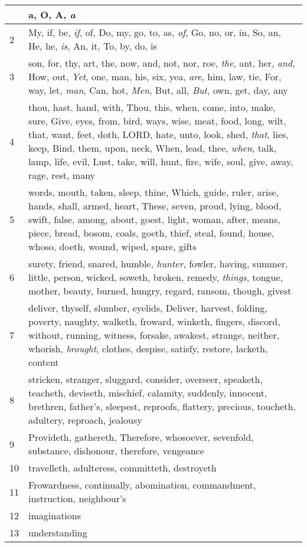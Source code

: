 \begin{center}
\begin{longtable}{l|p{3.75in}}
\hline \hline 
\endlastfoot 
1 & a, O, A, \emph{a}\\ \hline 
2 & My, if, be, \emph{if}, of, Do, my, go, to, as, \emph{of}, Go, no, or, in, So, an, He, he, \emph{is}, An, it, To, by, do, is\\ \hline 
3 & son, for, thy, art, the, now, and, not, nor, roe, \emph{the}, ant, her, \emph{and}, How, out, \emph{Yet}, one, man, his, six, yea, \emph{are}, him, law, tie, For, way, let, \emph{man}, Can, hot, \emph{Men}, But, all, \emph{But}, own, get, day, any\\ \hline 
4 & thou, hast, hand, with, Thou, this, when, come, into, make, sure, Give, eyes, from, bird, ways, wise, meat, food, long, wilt, that, want, feet, doth, LORD, hate, unto, look, shed, \emph{that}, lies, keep, Bind, them, upon, neck, When, lead, thee, \emph{when}, talk, lamp, life, evil, Lust, take, will, hunt, fire, wife, soul, give, away, rage, rest, many\\ \hline 
5 & words, mouth, taken, sleep, thine, Which, guide, ruler, arise, hands, shall, armed, heart, These, seven, proud, lying, blood, swift, false, among, about, goest, light, woman, after, means, piece, bread, bosom, coals, goeth, thief, steal, found, house, whoso, doeth, wound, wiped, spare, gifts\\ \hline 
6 & surety, friend, snared, humble, \emph{hunter}, fowler, having, summer, little, person, wicked, soweth, broken, remedy, \emph{things}, tongue, mother, beauty, burned, hungry, regard, ransom, though, givest\\ \hline 
7 & deliver, thyself, slumber, eyelids, Deliver, harvest, folding, poverty, naughty, walketh, froward, winketh, fingers, discord, without, running, witness, forsake, awakest, strange, neither, whorish, \emph{brought}, clothes, despise, satisfy, restore, lacketh, content\\ \hline 
8 & stricken, stranger, sluggard, consider, overseer, speaketh, teacheth, deviseth, mischief, calamity, suddenly, innocent, brethren, father's, sleepest, reproofs, flattery, precious, toucheth, adultery, reproach, jealousy\\ \hline 
9 & Provideth, gathereth, Therefore, whosoever, sevenfold, substance, dishonour, therefore, vengeance\\ \hline 
10 & travelleth, adulteress, committeth, destroyeth\\ \hline 
11 & Frowardness, continually, abomination, commandment, instruction, neighbour's\\ \hline 
12 & imaginations\\ \hline 
13 & understanding\\ \hline 
\end{longtable} 
\end{center} 




 
